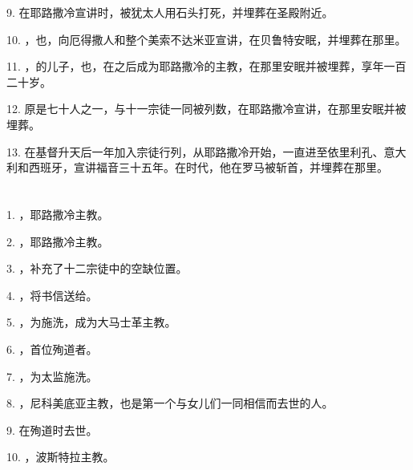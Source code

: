 9. 在耶路撒冷宣讲时，被犹太人用石头打死，并埋葬在圣殿附近。\par

10. ，也，向厄得撒人和整个美索不达米亚宣讲，在贝鲁特安眠，并埋葬在那里。\par

11. ，的儿子，也，在之后成为耶路撒冷的主教，在那里安眠并被埋葬，享年一百二十岁。\par

12. 原是七十人之一，与十一宗徒一同被列数，在耶路撒冷宣讲，在那里安眠并被埋葬。\par

13. 在基督升天后一年加入宗徒行列，从耶路撒冷开始，一直进至依里利孔、意大利和西班牙，宣讲福音三十五年。在时代，他在罗马被斩首，并埋葬在那里。\par


\section{}

1. ，耶路撒冷主教。\par

2. ，耶路撒冷主教。\par

3. ，补充了十二宗徒中的空缺位置。\par

4. ，将书信送给。\par

5. ，为施洗，成为大马士革主教。\par

6. ，首位殉道者。\par

7. ，为太监施洗。\par

8. ，尼科美底亚主教，也是第一个与女儿们一同相信而去世的人。\par

9. 在殉道时去世。\par

10. ，波斯特拉主教。\par

